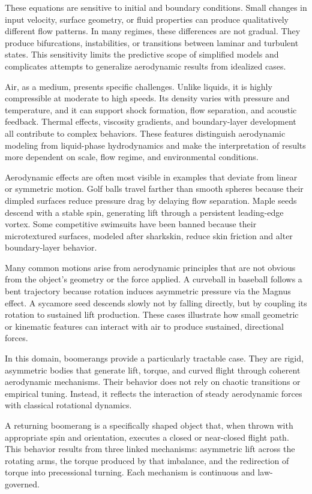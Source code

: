 These equations are sensitive to initial and boundary conditions. Small changes in input velocity, surface geometry, or fluid properties can produce qualitatively different flow patterns. In many regimes, these differences are not gradual. They produce bifurcations, instabilities, or transitions between laminar and turbulent states. This sensitivity limits the predictive scope of simplified models and complicates attempts to generalize aerodynamic results from idealized cases.

Air, as a medium, presents specific challenges. Unlike liquids, it is highly compressible at moderate to high speeds. Its density varies with pressure and temperature, and it can support shock formation, flow separation, and acoustic feedback. Thermal effects, viscosity gradients, and boundary-layer development all contribute to complex behaviors. These features distinguish aerodynamic modeling from liquid-phase hydrodynamics and make the interpretation of results more dependent on scale, flow regime, and environmental conditions.

Aerodynamic effects are often most visible in examples that deviate from linear or symmetric motion. Golf balls travel farther than smooth spheres because their dimpled surfaces reduce pressure drag by delaying flow separation. Maple seeds descend with a stable spin, generating lift through a persistent leading-edge vortex. Some competitive swimsuits have been banned because their microtextured surfaces, modeled after sharkskin, reduce skin friction and alter boundary-layer behavior.

Many common motions arise from aerodynamic principles that are not obvious from the object's geometry or the force applied. A curveball in baseball follows a bent trajectory because rotation induces asymmetric pressure via the Magnus effect. A sycamore seed descends slowly not by falling directly, but by coupling its rotation to sustained lift production. These cases illustrate how small geometric or kinematic features can interact with air to produce sustained, directional forces.

In this domain, boomerangs provide a particularly tractable case. They are rigid, asymmetric bodies that generate lift, torque, and curved flight through coherent aerodynamic mechanisms. Their behavior does not rely on chaotic transitions or empirical tuning. Instead, it reflects the interaction of steady aerodynamic forces with classical rotational dynamics.

A returning boomerang is a specifically shaped object that, when thrown with appropriate spin and orientation, executes a closed or near-closed flight path. This behavior results from three linked mechanisms: asymmetric lift across the rotating arms, the torque produced by that imbalance, and the redirection of torque into precessional turning. Each mechanism is continuous and law-governed.

